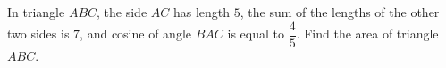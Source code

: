 In triangle $ABC$, the side $AC$ has length $5$, the sum of the lengths of the other two sides is $7$, and cosine of angle $BAC$ is equal to $\dfrac{4}{5}$. Find the area of triangle $ABC$.
